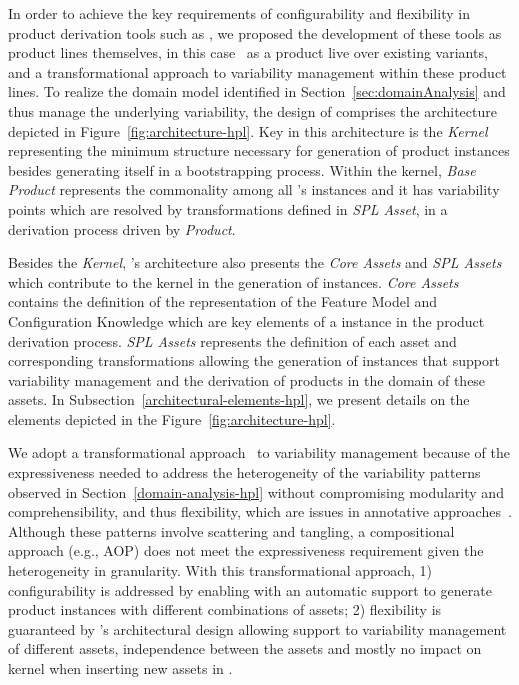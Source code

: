 
In order to achieve the key requirements of configurability and flexibility in product derivation tools such as \hp{}, we proposed the development of these tools as product lines themselves, in this case~\hpl{} as a product live over existing \hp{} variants, and a transformational approach to variability management within these product lines. To realize the domain model identified in Section~\ref{sec:domainAnalysis} and thus manage the underlying variability, the design of \hpl{} comprises the architecture depicted in Figure~\ref{fig:architecture-hpl}. Key in this architecture is the \textit{Kernel} representing the minimum structure necessary for generation of product \hpl{} instances besides generating itself in a bootstrapping process. Within the kernel, \emph{Base Product} represents the commonality among all \hpl{}'s instances and it has variability points which are resolved by transformations defined in \emph{\hp{} SPL Asset}, in a derivation process driven by \emph{\hp{} Product}.

Besides the \textit{Kernel}, \hpl's architecture also presents the \textit{Core Assets} and \textit{SPL Assets} which contribute to the kernel in the generation of \hpl{} instances. \textit{Core Assets} contains the definition of the representation of the Feature Model and Configuration Knowledge which are key elements of a \hpl{} instance in the product derivation process. \textit{SPL Assets} represents the definition of each asset and corresponding transformations allowing the generation of \hpl{} instances that support variability management and the derivation of products in the domain of these assets. In Subsection~\ref{architectural-elements-hpl}, we present details on the elements depicted in the Figure~\ref{fig:architecture-hpl}.

We adopt a transformational approach~\cite{deltaSchaefer} to variability management because of the expressiveness needed to address the heterogeneity of the variability patterns observed in Section~\ref{domain-analysis-hpl} without compromising modularity and comprehensibility, and thus flexibility, which are issues in annotative approaches~\cite{kastner:2008}. Although these patterns involve scattering and tangling, a compositional approach (e.g., AOP) does not meet the expressiveness requirement given the heterogeneity in granularity. With this transformational approach, 1) configurability is addressed by enabling \hpl{} with an automatic support to generate product instances with different combinations of assets; 2) flexibility is guaranteed by \hpl{}'s architectural design allowing support to variability management of different assets, independence between the assets and mostly no impact on kernel when inserting new assets in \hpl.

